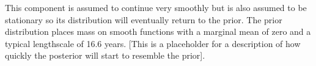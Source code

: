 This component is assumed to continue very smoothly but is also assumed to be stationary so its distribution will eventually return to the prior.
The prior distribution places mass on smooth functions with a marginal mean of zero and a typical lengthscale of 16.6 years.
[This is a placeholder for a description of how quickly the posterior will start to resemble the prior].
